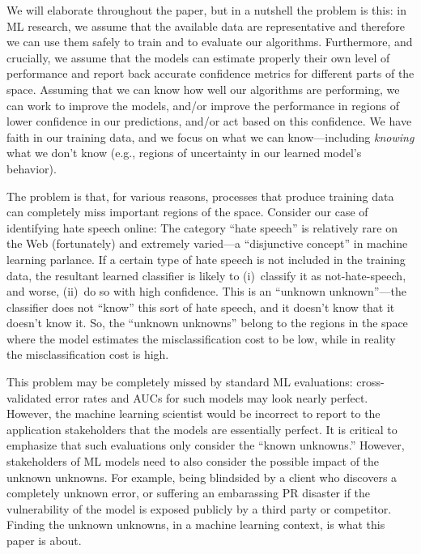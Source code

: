 We will elaborate throughout the paper, but in a nutshell the problem is this: in ML research, we assume that the available data are representative and therefore we can use them safely to train and to evaluate our algorithms. Furthermore, and crucially, we assume that the models can estimate properly their own level of performance and report back accurate confidence metrics for different parts of the space. Assuming that we can know how well our algorithms are performing, we can work to improve the models, and/or improve the performance in regions of lower confidence in our predictions, and/or act based on this confidence.  We have faith in our training data, and we focus on what we can know---including \emph{knowing} what we don't know (e.g., regions of uncertainty in our learned model's behavior).

The problem is that, for various reasons, processes that produce training data can completely miss important regions of the space.  Consider our case of identifying hate speech online: The category ``hate speech'' is relatively rare on the Web (fortunately) and extremely varied---a ``disjunctive concept'' in machine learning parlance.  If a certain type of hate speech is not included in the training data, the resultant learned classifier is likely to (i)~classify it as not-hate-speech, and worse, (ii)~do so with high confidence.  This is an ``unknown unknown''---the classifier does not ``know'' this sort of hate speech, and it doesn't know that it doesn't know it. So, the ``unknown unknowns'' belong to the regions in the space where the model estimates the misclassification cost to be low, while in reality the misclassification cost is high.

This problem may be completely missed by standard ML evaluations: cross-validated error rates and AUCs for such models may look nearly perfect.  However, the machine learning scientist would be incorrect to report to the application stakeholders that the models are essentially perfect.  It is critical to emphasize that such evaluations only consider the ``known unknowns.'' However, stakeholders of ML models need to also consider the possible impact of the unknown unknowns. For example, being blindsided by a client who discovers a completely unknown error, or suffering an embarassing PR disaster if the vulnerability of the model is exposed publicly by a third party or competitor.   Finding the unknown unknowns, in a machine learning context, is what this paper is about.

